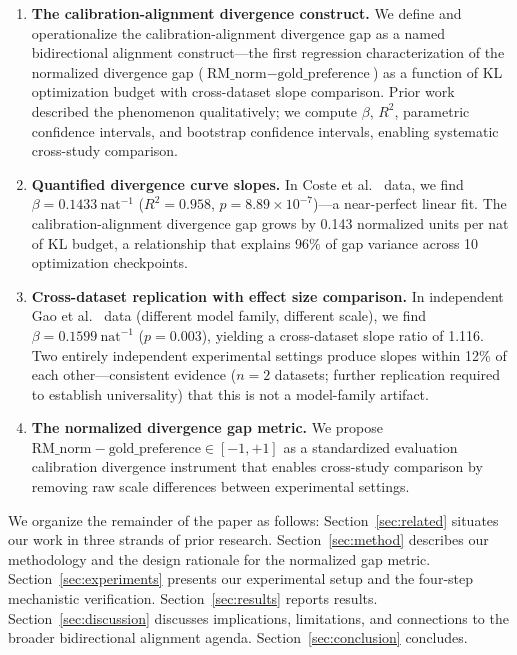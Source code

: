 \begin{enumerate}
\item \textbf{The calibration-alignment divergence construct.} We define and operationalize the calibration-alignment divergence gap as a named bidirectional alignment construct---the first regression characterization of the normalized divergence gap ($\text{RM\_norm} - \text{gold\_preference}$) as a function of KL optimization budget with cross-dataset slope comparison. Prior work described the phenomenon qualitatively; we compute $\beta$, $R^2$, parametric confidence intervals, and bootstrap confidence intervals, enabling systematic cross-study comparison.

\item \textbf{Quantified divergence curve slopes.} In Coste et al.~\cite{Coste2023Reward} data, we find $\beta = 0.1433\ \text{nat}^{-1}$ ($R^2 = 0.958$, $p = 8.89 \times 10^{-7}$)---a near-perfect linear fit. The calibration-alignment divergence gap grows by 0.143 normalized units per nat of KL budget, a relationship that explains 96\% of gap variance across 10 optimization checkpoints.

\item \textbf{Cross-dataset replication with effect size comparison.} In independent Gao et al.~\cite{Gao2023Scaling} data (different model family, different scale), we find $\beta = 0.1599\ \text{nat}^{-1}$ ($p = 0.003$), yielding a cross-dataset slope ratio of 1.116. Two entirely independent experimental settings produce slopes within 12\% of each other---consistent evidence ($n=2$ datasets; further replication required to establish universality) that this is not a model-family artifact.

\item \textbf{The normalized divergence gap metric.} We propose $\text{RM\_norm} - \text{gold\_preference} \in [-1, +1]$ as a standardized evaluation calibration divergence instrument that enables cross-study comparison by removing raw scale differences between experimental settings.
\end{enumerate}

We organize the remainder of the paper as follows: Section~\ref{sec:related} situates our work in three strands of prior research. Section~\ref{sec:method} describes our methodology and the design rationale for the normalized gap metric. Section~\ref{sec:experiments} presents our experimental setup and the four-step mechanistic verification. Section~\ref{sec:results} reports results. Section~\ref{sec:discussion} discusses implications, limitations, and connections to the broader bidirectional alignment agenda. Section~\ref{sec:conclusion} concludes.
